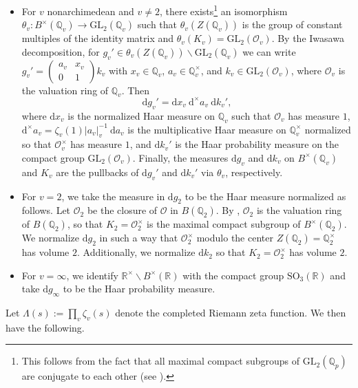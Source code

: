 \documentclass[11pt]{amsart}
\theoremstyle{definition}
\begin{document}
\begin{itemize}
    \item For $v$ nonarchimedean and $v\neq 2$, there exists\footnote{This follows from the fact that all maximal compact subgroups of $\mathrm{GL}_2(\mathbb{Q}_p)$ are conjugate to each other (see \cite[Thm.~7.2.16, p.~327]{BroConOes}).} an isomorphism $\theta_{v} : B^{\times}(\mathbb{Q}_v) \rightarrow \mathrm{GL}_2(\mathbb{Q}_v)$ such that $\theta_v(Z(\mathbb{Q}_v))$ is the group of constant multiples of the identity matrix and $\theta_{v}(K_v) = \mathrm{GL}_2(\mathcal{O}_{v})$. By the Iwasawa decomposition, for $g_{v}' \in \theta_{v}(Z(\mathbb{Q}_v))\backslash \mathrm{GL}_{2}(\mathbb{Q}_v)$ we can write $g_{v}' = \begin{pmatrix}
        a_v & x_v \\ 0 & 1
    \end{pmatrix} k_v$ with $x_v \in \mathbb{Q}_v$, $a_v \in \mathbb{Q}_{v}^{\times}$, and $k_v \in \mathrm{GL}_2(\mathcal{O}_{v})$, where $\mathcal{O}_v$ is the valuation ring of $\mathbb{Q}_v$. Then $$\mathrm{d}g_{v}' = \mathrm{d}x_v \: \mathrm{d}^{\times} a_v \: \mathrm{d}k_{v}',$$ where $\mathrm{d}x_{v}$ is the normalized Haar measure on $\mathbb{Q}_{v}$ such that $\mathcal{O}_{v}$ has measure $1$, $\mathrm{d}^{\times} a_{v} = \zeta_{v}(1) |a_{v}|_{v}^{-1} \: \mathrm{d}a_{v}$ is the multiplicative Haar measure on $\mathbb{Q}_{v}^{\times}$ normalized so that $\mathcal{O}_{v}^{\times}$ has measure $1$, and $\mathrm{d}k_{v}'$ is the Haar probability measure on the compact group $\mathrm{GL}_{2}(\mathcal{O}_{v})$. Finally, the measures $\mathrm{d}g_{v}$ and $\mathrm{d}k_{v}$ on $B^{\times}(\mathbb{Q}_{v})$ and $K_{v}$ are the pullbacks of $\mathrm{d}g_{v}'$ and $\mathrm{d}k_{v}'$ via $\theta_{v}$, respectively.
    \item For $v=2$, we take the measure in $\mathrm{d}g_2$ to be the Haar measure normalized as follows. Let $\mathcal{O}_2$ be the closure of $\mathcal{O}$ in $B(\mathbb{Q}_2)$. By \cite[Exercise 13.1]{Voight}, $\mathcal{O}_2$ is the valuation ring of $B(\mathbb{Q}_2)$, so that $K_2 = \mathcal{O}_{2}^{\times}$ is the maximal compact subgroup of $B^{\times}(\mathbb{Q}_2)$. We normalize $\mathrm{d}g_2$ in such a way that $\mathcal{O}_{2}^{\times}$ modulo the center $Z(\mathbb{Q}_2) = \mathbb{Q}_2^{\times}$ has volume $2$. Additionally, we normalize $\mathrm{d}k_{2}$ so that $K_{2} = \mathcal{O}_{2}^{\times}$ has volume $2$.
    \item For $v=\infty$, we identify $\mathbb{R}^{\times} \backslash B^{\times}(\mathbb{R})$ with the compact group $\mathrm{SO}_{3}(\mathbb{R})$ and take $\mathrm{d}g_{\infty}$ to be the Haar probability measure.
\end{itemize}
Let $\Lambda(s) := \prod_{v} \zeta_v(s)$ denote the completed Riemann zeta function. We then have the following.
\end{document}
